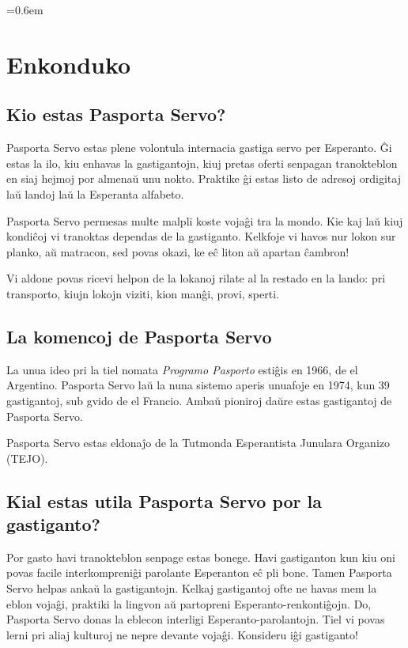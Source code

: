 \thispagestyle{plain}
{
  \titleformat{\section}[block]{}{}{0pt}{\huge\textbf}
  \parskip=0.6em

\section{Enkonduko}

\subsection{Kio estas Pasporta Servo?}


Pasporta Servo estas plene volontula internacia gastiga servo per Esperanto. Ĝi estas la ilo, kiu enhavas la gastigantojn, kiuj pretas oferti senpagan tranokteblon en siaj hejmoj por almenaŭ unu nokto. Praktike ĝi estas listo de adresoj ordigitaj laŭ landoj laŭ la Esperanta alfabeto.

Pasporta Servo permesas multe malpli koste vojaĝi tra la mondo. Kie kaj laŭ kiuj kondiĉoj vi tranoktas dependas de la gastiganto. Kelkfoje vi havos nur lokon sur planko, aŭ matracon, sed povas okazi, ke eĉ liton aŭ apartan ĉambron!

Vi aldone povas ricevi helpon de la lokanoj rilate al la restado en la lando: pri transporto, kiujn lokojn viziti, kion manĝi, provi, sperti.

\subsection{La komencoj de Pasporta Servo}

La unua ideo pri la tiel nomata \textit{Programo Pasporto} estiĝis en 1966, de  el Argentino. Pasporta Servo laŭ la nuna sistemo aperis unuafoje en 1974, kun 39 gastigantoj, sub gvido de  el Francio. Ambaŭ pioniroj daŭre estas gastigantoj de Pasporta Servo.

Pasporta Servo estas eldonaĵo de la Tutmonda Esperantista Junulara Organizo (TEJO).

\subsection{Kial estas utila Pasporta Servo por la gastiganto?}

Por gasto havi tranokteblon senpage estas bonege. Havi gastiganton kun kiu oni povas facile interkompreniĝi parolante Esperanton eĉ pli bone. Tamen Pasporta Servo helpas ankaŭ la gastigantojn. Kelkaj gastigantoj ofte ne havas mem la eblon vojaĝi, praktiki la lingvon aŭ partopreni Esperanto-renkontiĝojn. Do, Pasporta Servo donas la eblecon interligi Esperanto-parolantojn. Tiel vi povas lerni pri aliaj kulturoj ne nepre devante vojaĝi. Konsideru iĝi gastiganto!

}
